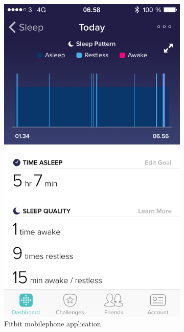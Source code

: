 \documentclass[12pt]{article} %
\begin{document}
\begin{figure}[H]
    \centering
    \begin{subfigure}[b]{0.45\textwidth}
        \includegraphics[width=\textwidth]{img/26-10-fitbit}
        \caption{Fitbit mobilephone application}
        \label{fig:fitbit1}
    \end{subfigure}
    ~ %
    \begin{subfigure}[b]{0.45\textwidth}

\end{subfigure}
\end{figure}
\end{document}
